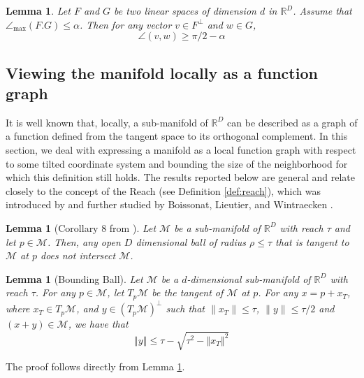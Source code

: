 \documentclass[12pt]{article}
\newtheorem{Lemma}[Theorem]{Lemma}
\theoremstyle{remark}
\newcommand{\RR}{\mathbb{R}}
\newcommand{\MM}{\mathcal{M}}
\newcommand{\norm}[1]{\left\Vert #1 \right\Vert}
\newcommand{\maxangle}{\angle_{\max}}
\begin{document}
\begin{appendices}
\begin{Lemma}\label{lem:angle_space_perp_space}
Let $F$ and $G$ be two linear spaces of dimension $d$ in $\RR^D$. Assume that $\maxangle(F.G)\leq \alpha$. Then for any vector $v \in F^\perp$ and  $w\in G$,
\[
\angle(v,w) \geq \pi/2 - \alpha
\]
\end{Lemma}

\subsection{Viewing the manifold locally as a function graph}
It is well known that, locally, a sub-manifold of $\RR^D$ can be described as a graph of a function defined from the tangent space to its orthogonal complement.
In this section, we deal with expressing a manifold as a local function graph with respect to some tilted coordinate system and bounding the size of the neighborhood for which this definition still holds.
The results reported below are general and relate closely to the concept of the Reach (see Definition \ref{def:reach}), which was introduced by \cite{federer1959curvature} and further studied by Boissonat, Lieutier, and Wintraecken \cite{boissonnat2017reach}. 

\begin{Lemma}[Corollary 8 from \cite{boissonnat2017reach}] \label{lem:reach_ball_no_intersect_clean}
    Let $\MM$ be a sub-manifold of $\RR^D$ with reach $\tau$ and let $p\in\MM$.
    Then, any open $D$ dimensional ball of radius $\rho \leq \tau$ that is tangent to $\MM$ at $p$ does not intersect $\MM$.
\end{Lemma}




\begin{Lemma}[Bounding Ball]\label{lem:f_bound_circle_no_func_clean}
Let $\MM$ be a $d$-dimensional sub-manifold of $\RR^D$ with reach $\tau$. For any $p \in \MM$, let $T_{p}\MM$ be the tangent of $\MM$ at $p$.
    For any $x = p + x_T$, where $x_T\in T_p\MM$, and $y\in (T_p\MM)^\perp$  such that $\|x_T\|\leq \tau$, $\|y\| \leq \tau/2$ and $(x + y)\in \MM$, we have that 
    \[
    \norm{y} \leq \tau-\sqrt{\tau^2-\norm{x_T}^2}
    \]
\end{Lemma}
The proof follows directly from Lemma \ref{lem:reach_ball_no_intersect_clean}.



\end{appendices}
\end{document}

